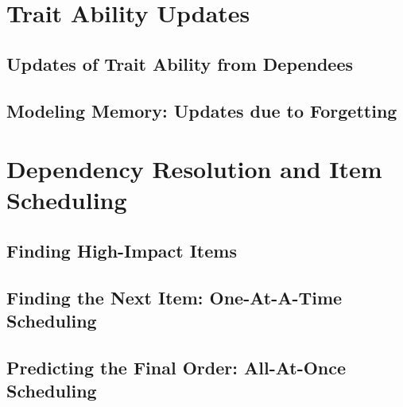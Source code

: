 \section{Trait Ability Updates}

\subsection{Updates of Trait Ability from Dependees}
\subsection{Modeling Memory: Updates due to Forgetting}

\section{Dependency Resolution and Item Scheduling}

\subsection{Finding High-Impact Items}
\subsection{Finding the Next Item: One-At-A-Time Scheduling}
\subsection{Predicting the Final Order: All-At-Once Scheduling}
